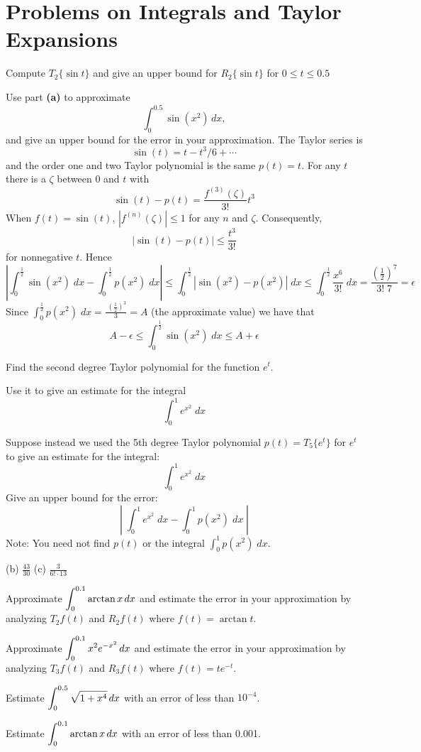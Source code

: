 \section{Problems on Integrals and Taylor Expansions} %
\problemfont %
\begin{multicols}{2}
\problem \subprob Compute $T_2\{\sin t\}$ and give an upper bound for $R_2\{\sin %
t\}$ for $0\leq t\leq 0.5$

\subprob Use part \textbf{(a)} to approximate 
\[
  \int_0^{0.5}\sin(x^2)\,dx,
\]
and give an upper bound for the error in your approximation.
\answer The Taylor series is %
\[
\sin(t)=t-t^3/6+\cdots
\]
and  the order one and two Taylor polynomial is 
the same $p(t)=t$.
For any $t$ there is a $\zeta$ between
$0$ and $t$ with 
$$\sin(t)-p(t)=\frac{f^{(3)}(\zeta)}{3!}t^3$$
When $f(t)=\sin(t)$,
$|f^{(n)}(\zeta)|\leq 1$
for any $n$ and $\zeta$.
Consequently, $$|\sin(t)-p(t)|\leq \frac{t^3}{3!}$$
for nonnegative $t$.
Hence
$$|\int_0^{\frac12} \sin(x^2)\;dx - \int_0^{\frac12} p(x^2)\;dx|\leq 
\int_0^{\frac12} |\sin(x^2)-p(x^2)|\;dx \leq 
\int_0^{\frac12} \frac{x^6}{3!} \; dx = 
\frac{(\frac12)^7}{3!\; 7}=\epsilon $$
Since $\int_0^{\frac12} p(x^2)\;dx = \frac{\;(\frac12)^3}{3}=A$
(the approximate value)
we have that 
$$ A-\epsilon\leq  \int_0^{\frac12} \sin(x^2)\;dx 
\leq A+\epsilon$$
\endanswer

\problem \subprob Find the second degree Taylor polynomial for the function $e^t$.   %

\subprob Use it to give an estimate for the integral
\[
  \int_0^1 e^{x^2}\;dx
\]

\subprob Suppose instead we used the 5th degree Taylor polynomial $p(t) =
T_5\{e^t\}$ for
$e^t$ to give an estimate for the integral:
\[
  \int_0^1 e^{x^2}\;dx
\]
Give an upper bound for the error:
\[
  \left|\;\int_0^1 e^{x^2}\;dx-\int_0^1 p(x^2)\;dx\;\right|
\]
Note: You need not find $p(t)$ or the integral
$\int_0^1 p(x^2)\;dx$.

\answer (b) $\frac{43}{30}$ (c) $\frac{3}{6!\cdot 13}$  %
\endanswer

\problem Approximate $\displaystyle\int_0^{0.1}\arctan x\,dx$ and estimate the %
error in your approximation by analyzing $T_2f(t)$ and $R_2f(t)$ where
$f(t) = \arctan t$.

\problem Approximate $\displaystyle\int_0^{0.1}x^2e^{-x^2}\,dx$ and estimate the %
error in your approximation by analyzing $T_3f(t)$ and $R_3f(t)$ where
$f(t) = te^{-t}$.

\problem Estimate $\displaystyle\int_0^{0.5}\sqrt{1+x^4}\,dx$ with an error of less %
than $10^{-4}$.

\problem Estimate $\displaystyle\int_0^{0.1} \arctan x\,dx$ with an error of less %
than 0.001.

\end{multicols}
\noproblemfont


